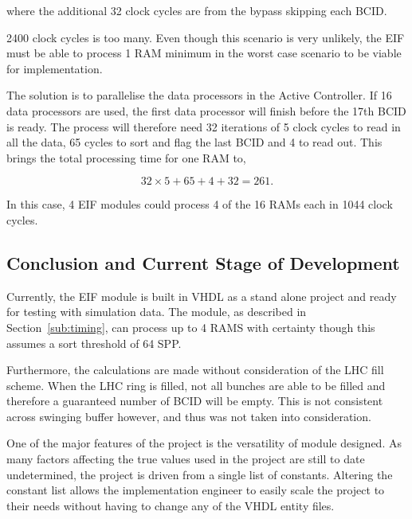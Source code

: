 		where the additional 32 clock cycles are from the bypass skipping each BCID.

		2400 clock cycles is too many. 
		Even though this scenario is very unlikely, the EIF must be able to process 1 RAM minimum in the worst case scenario to be viable for implementation.

		The solution is to parallelise the data processors in the Active Controller.
		If 16 data processors are used, the first data processor will finish before the 17th BCID is ready.
		The process will therefore need 32 iterations of 5 clock cycles to read in all the data, 65 cycles to sort and flag the last BCID and 4 to read out.
		This brings the total processing time for one RAM to,

		\begin{equation}
			32 \times 5 + 65 + 4 + 32 = 261.
		\end{equation}  

		In this case, 4 EIF modules could process 4 of the 16 RAMs each in 1044 clock cycles.


	\subsection{Conclusion and Current Stage of Development} %
	\label{sub:conclusion}

	Currently, the EIF module is built in VHDL as a stand alone project and ready for testing with simulation data.
	The module, as described in Section~\ref{sub:timing}, can process up to 4 RAMS with certainty though this assumes a sort threshold of 64 SPP.
	
	Furthermore, the calculations are made without consideration of the LHC fill scheme.
	When the LHC ring is filled, not all bunches are able to be filled and therefore a guaranteed number of BCID will be empty.
	This is not consistent across swinging buffer however, and thus was not taken into consideration.

	One of the major features of the project is the versatility of module designed.
	As many factors affecting the true values used in the project are still to date undetermined, the project is driven from a single list of constants.
	Altering the constant list allows the implementation engineer to easily scale the project to their needs without having to change any of the VHDL entity files.



